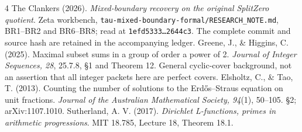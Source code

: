 \documentclass[10pt,a4paper]{article}
\begin{document}
\begingroup\small
\begin{thebibliography}{4}
 The Clankers (2026). \emph{Mixed-boundary recovery on the original
SplitZero quotient}. Zeta workbench, \texttt{tau-mixed-boundary-formal/RESEARCH\_NOTE.md},
BR1--BR2 and BR6--BR8; read at \texttt{1efd5333\ldots2644c3}.
The complete commit and source hash are retained in the accompanying ledger.
 Greene, J., \& Higgins, C. (2025). Maximal subset sums in a group
of order a power of 2. \emph{Journal of Integer Sequences, 28}, 25.7.8,
\S1 and Theorem 12. General cyclic-cover background, not an assertion that
all integer packets here are perfect covers.
 Elsholtz, C., \& Tao, T. (2013). Counting the number of solutions
to the Erd\H{o}s--Straus equation on unit fractions.
\emph{Journal of the Australian Mathematical Society, 94}(1), 50--105.
\S2; arXiv:1107.1010.
 Sutherland, A. V. (2017). \emph{Dirichlet L-functions,
primes in arithmetic progressions}. MIT 18.785, Lecture 18, Theorem 18.1.
\end{thebibliography}
\endgroup
\end{document}
